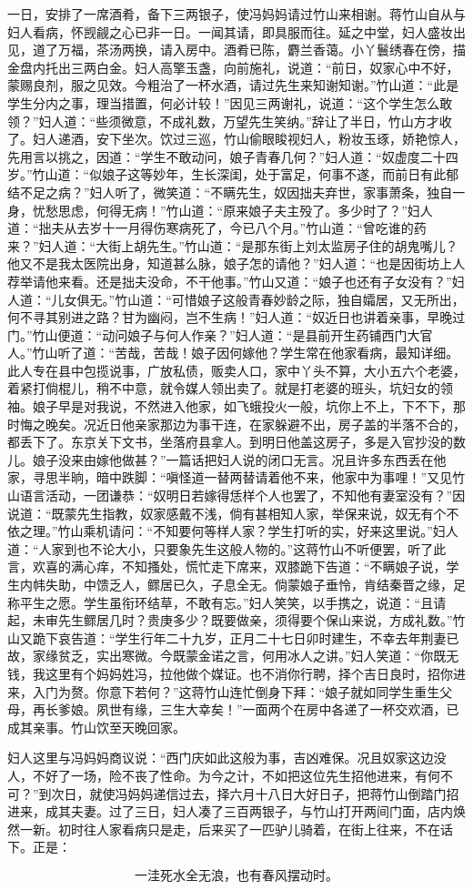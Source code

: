 一日，安排了一席酒肴，备下三两银子，使冯妈妈请过竹山来相谢。蒋竹山自从与妇人看病，怀觊觎之心已非一日。一闻其请，即具服而往。延之中堂，妇人盛妆出见，道了万福，茶汤两换，请入房中。酒肴已陈，麝兰香蔼。小丫鬟绣春在傍，描金盘内托出三两白金。妇人高擎玉盏，向前施礼，说道：“前日，奴家心中不好，蒙赐良剂，服之见效。今粗治了一杯水酒，请过先生来知谢知谢。”竹山道：“此是学生分内之事，理当措置，何必计较！”因见三两谢礼，说道：“这个学生怎么敢领？”妇人道：“些须微意，不成礼数，万望先生笑纳。”辞让了半日，竹山方才收了。妇人递酒，安下坐次。饮过三巡，竹山偷眼睃视妇人，粉妆玉琢，娇艳惊人，先用言以挑之，因道：“学生不敢动问，娘子青春几何？”妇人道：“奴虚度二十四岁。”竹山道：“似娘子这等妙年，生长深闺，处于富足，何事不遂，而前日有此郁结不足之病？”妇人听了，微笑道：“不瞒先生，奴因拙夫弃世，家事萧条，独自一身，忧愁思虑，何得无病！”竹山道：“原来娘子夫主殁了。多少时了？”妇人道：“拙夫从去岁十一月得伤寒病死了，今已八个月。”竹山道：“曾吃谁的药来？”妇人道：“大街上胡先生。”竹山道：“是那东街上刘太监房子住的胡鬼嘴儿？他又不是我太医院出身，知道甚么脉，娘子怎的请他？”妇人道：“也是因街坊上人荐举请他来看。还是拙夫没命，不干他事。”竹山又道：“娘子也还有子女没有？”妇人道：“儿女俱无。”竹山道：“可惜娘子这般青春妙龄之际，独自孀居，又无所出，何不寻其别进之路？甘为幽闷，岂不生病！”妇人道：“奴近日也讲着亲事，早晚过门。”竹山便道：“动问娘子与何人作亲？”妇人道：“是县前开生药铺西门大官人。”竹山听了道：“苦哉，苦哉！娘子因何嫁他？学生常在他家看病，最知详细。此人专在县中包揽说事，广放私债，贩卖人口，家中丫头不算，大小五六个老婆，着紧打倘棍儿，稍不中意，就令媒人领出卖了。就是打老婆的班头，坑妇女的领袖。娘子早是对我说，不然进入他家，如飞蛾投火一般，坑你上不上，下不下，那时悔之晚矣。况近日他亲家那边为事干连，在家躲避不出，房子盖的半落不合的，都丢下了。东京关下文书，坐落府县拿人。到明日他盖这房子，多是入官抄没的数儿。娘子没来由嫁他做甚？”一篇话把妇人说的闭口无言。况且许多东西丢在他家，寻思半晌，暗中跌脚：“嗔怪道一替两替请着他不来，他家中为事哩！”又见竹山语言活动，一团谦恭：“奴明日若嫁得恁样个人也罢了，不知他有妻室没有？”因说道：“既蒙先生指教，奴家感戴不浅，倘有甚相知人家，举保来说，奴无有个不依之理。”竹山乘机请问：“不知要何等样人家？学生打听的实，好来这里说。”妇人道：“人家到也不论大小，只要象先生这般人物的。”这蒋竹山不听便罢，听了此言，欢喜的满心痒，不知搔处，慌忙走下席来，双膝跪下告道：“不瞒娘子说，学生内帏失助，中馈乏人，鳏居已久，子息全无。倘蒙娘子垂怜，肯结秦晋之缘，足称平生之愿。学生虽衔环结草，不敢有忘。”妇人笑笑，以手携之，说道：“且请起，未审先生鳏居几时？贵庚多少？既要做亲，须得要个保山来说，方成礼数。”竹山又跪下哀告道：“学生行年二十九岁，正月二十七日卯时建生，不幸去年荆妻已故，家缘贫乏，实出寒微。今既蒙金诺之言，何用冰人之讲。”妇人笑道：“你既无钱，我这里有个妈妈姓冯，拉他做个媒证。也不消你行聘，择个吉日良时，招你进来，入门为赘。你意下若何？”这蒋竹山连忙倒身下拜：“娘子就如同学生重生父母，再长爹娘。夙世有缘，三生大幸矣！”一面两个在房中各递了一杯交欢酒，已成其亲事。竹山饮至天晚回家。

妇人这里与冯妈妈商议说：“西门庆如此这般为事，吉凶难保。况且奴家这边没人，不好了一场，险不丧了性命。为今之计，不如把这位先生招他进来，有何不可？”到次日，就使冯妈妈递信过去，择六月十八日大好日子，把蒋竹山倒踏门招进来，成其夫妻。过了三日，妇人凑了三百两银子，与竹山打开两间门面，店内焕然一新。初时往人家看病只是走，后来买了一匹驴儿骑着，在街上往来，不在话下。正是：

\[
一洼死水全无浪，也有春风摆动时。
\]
